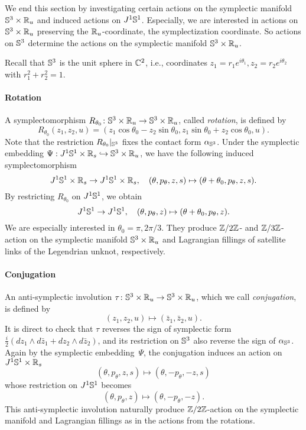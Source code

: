 We end this section by investigating certain actions on the symplectic manifold $\mathbb{S}^3\times \mathbb{R}_u$ and induced actions on $J^1\mathbb{S}^1$.
Especially, we are interested in actions on $\mathbb{S}^3\times \mathbb{R}_u$ preserving the $\mathbb{R}_u$-coordinate, the symplectization coordinate. So actions on $\mathbb{S}^3$ determine the actions on the symplectic manifold $\mathbb{S}^3\times \mathbb{R}_u$.

Recall that $\mathbb{S}^3$ is the unit sphere in $\mathbb{C}^2$, i.e., coordinates $z_1=r_1 e^{i\theta_1}, z_2=r_2 e^{i\theta_2}$ with $r_1^2 + r_2^2=1$.

\paragraph{Rotation} A symplectomorphism $R_{\theta_0} \colon \mathbb{S}^3\times \mathbb{R}_u \to \mathbb{S}^3\times \mathbb{R}_u$, called {\em rotation}, is defined by
\[
R_{\theta_0}(z_1, z_2,u)=(z_1\cos\theta_0 -z_2\sin\theta_0, z_1\sin\theta_0+z_2\cos\theta_0,u).
\]
Note that the restriction $R_{\theta_0}|_{\mathbb{S}^3}$ fixes the contact form $\alpha_{\mathbb{S}^3}$.
Under the symplectic embedding $\Psi:J^1\mathbb{S}^1\times \mathbb{R}_s \hookrightarrow \mathbb{S}^3\times \mathbb{R}_u$, we have the following induced symplectomorphism
\[
J^1\mathbb{S}^1\times \mathbb{R}_s \to J^1\mathbb{S}^1\times \mathbb{R}_s,\quad (\theta,p_{\theta},z,s)\mapsto (\theta+\theta_0,p_{\theta},z,s).
\]
By restricting $R_{\theta_0}$ on $J^1\mathbb{S}^1$, we obtain
\[
J^1\mathbb{S}^1 \to J^1\mathbb{S}^1, \quad (\theta,p_{\theta},z)\mapsto (\theta+\theta_0,p_{\theta},z).
\]
We are especially interested in $\theta_0=\pi,2\pi/3$. They produce $\mathbb{Z}/2\mathbb{Z}$- and $\mathbb{Z}/3\mathbb{Z}$-action on the symplectic manifold $\mathbb{S}^3\times \mathbb{R}_u$ and Lagrangian fillings of satellite links of the Legendrian unknot, respectively.

\paragraph{Conjugation} An anti-symplectic involution $\tau \colon \mathbb{S}^3\times\mathbb{R}_u \to \mathbb{S}^3\times\mathbb{R}_u$, which we call {\em conjugation},  is defined by
\[
(z_1,z_2,u)\mapsto (\bar z_1,\bar z_2 ,u).
\]
It is direct to check that $\tau$ reverses the sign of symplectic form $\frac{i}{2}(dz_1\wedge d\bar z_1+dz_2\wedge d\bar z_2)$, and its restriction on $\mathbb{S}^3$ also reverse the sign of $\alpha_{\mathbb{S}^3}$. 
Again by the symplectic embedding~$\Psi$, the conjugation induces an action on $J^1\mathbb{S}^1\times \mathbb{R}_s$
\[
(\theta,p_\theta,z,s)\mapsto (\theta,-p_\theta,-z,s)
\]
whose restriction on $J^1\mathbb{S}^1$ becomes
\[
(\theta,p_\theta,z)\mapsto (\theta,-p_\theta,-z).
\]
This anti-symplectic involution naturally produce $\mathbb{Z}/2\mathbb{Z}$-action on the symplectic manifold and Lagrangian fillings as in the actions from the rotations.

